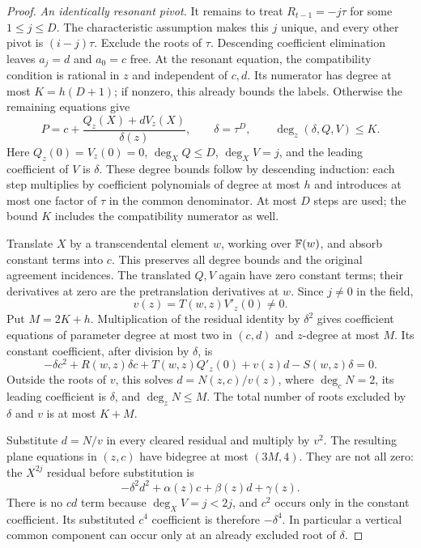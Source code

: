 \begin{proof}
\emph{An identically resonant pivot.}
It remains to treat $R_{t-1}=-j\tau$ for some $1\le j\le D$.
The characteristic assumption makes this $j$ unique, and every other
pivot is $(i-j)\tau$. Exclude the roots of $\tau$. Descending coefficient
elimination leaves $a_j=d$ and $a_0=c$ free. At the resonant equation,
the compatibility condition is rational in $z$ and independent of
$c,d$. Its numerator has degree at most $K=h(D+1)$; if nonzero, this
already bounds the labels. Otherwise the remaining equations give
\begin{equation}\label{eq:riccati-resonance-reconstruction}
 P=c+\frac{Q_z(X)+dV_z(X)}{\delta(z)},\qquad
 \delta=\tau^D,\qquad \deg_z(\delta,Q,V)\le K.
\end{equation}
Here $Q_z(0)=V_z(0)=0$, $\deg_XQ\le D$, $\deg_XV=j$, and the leading
coefficient of $V$ is $\delta$. These degree bounds follow by descending
induction: each step multiplies by coefficient polynomials of degree
at most $h$ and introduces at most one factor of $\tau$ in the common
denominator. At most $D$ steps are used; the bound $K$ includes the
compatibility numerator as well.

Translate $X$ by a transcendental element $w$, working over $\mathbb F(w)$,
and absorb constant terms into $c$. This preserves all degree bounds
and the original agreement incidences. The translated $Q,V$ again have
zero constant terms; their derivatives at zero are the pretranslation
derivatives at $w$. Since $j\ne0$ in the field,
\[
 v(z)=T(w,z)V'_z(0)\ne0.
\]
Put $M=2K+h$. Multiplication of the residual identity by $\delta^2$
gives coefficient equations of parameter degree at most two in $(c,d)$
and $z$-degree at most $M$. Its constant coefficient, after division by
$\delta$, is
\[
 -\delta c^2+R(w,z)\delta c+T(w,z)Q'_z(0)
       +v(z)d-S(w,z)\delta=0.
\]
Outside the roots of $v$, this solves $d=N(z,c)/v(z)$, where
$\deg_cN=2$, its leading coefficient is $\delta$, and
$\deg_zN\le M$. The total number of roots excluded by $\delta$ and $v$
is at most $K+M$.

Substitute $d=N/v$ in every cleared residual and multiply by $v^2$.
The resulting plane equations in $(z,c)$ have bidegree at most $(3M,4)$.
They are not all zero: the $X^{2j}$ residual before substitution is
\[
 -\delta^2d^2+\alpha(z)c+\beta(z)d+\gamma(z).
\]
There is no $cd$ term because $\deg_XV=j<2j$, and $c^2$ occurs only in
the constant coefficient. Its substituted $c^4$ coefficient is therefore
$-\delta^4$. In particular a vertical common component can occur only
at an already excluded root of $\delta$.


\end{proof}
